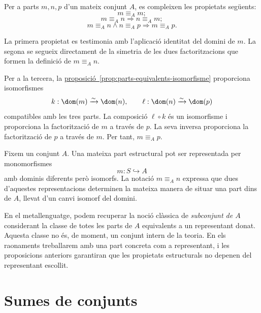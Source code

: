 \begin{proposicio}\label{prop:equivalencia-parts}
Per a parts \(m,n,p\) d'un mateix conjunt \(A\), es compleixen les propietats següents:
\[
m\equiv_A m;
\]
\[
m\equiv_A n\Longrightarrow n\equiv_A m;
\]
\[
m\equiv_A n\land n\equiv_A p
\Longrightarrow
m\equiv_A p.
\]
\end{proposicio}

\begin{prova}
La primera propietat es testimonia amb l'aplicació identitat del domini de \(m\). La segona se segueix directament de la simetria de les dues factoritzacions que formen la definició de \(m\equiv_A n\).

Per a la tercera, la \hyperref[prop:parts-equivalents-isomorfisme]{proposició~\ref*{prop:parts-equivalents-isomorfisme}} proporciona isomorfismes
\[
k:\dom(m)\xrightarrow{\sim}\dom(n),
\qquad
\ell:\dom(n)\xrightarrow{\sim}\dom(p)
\]
compatibles amb les tres parts. La composició \(\ell\circ k\) és un isomorfisme i proporciona la factorització de \(m\) a través de \(p\). La seva inversa proporciona la factorització de \(p\) a través de \(m\). Per tant, \(m\equiv_A p\).
\end{prova}

\begin{observacio}\label{obs:subconjunt-metallenguatge}
Fixem un conjunt \(A\). Una mateixa part estructural pot ser representada per monomorfismes
\[
m:S\hookrightarrow A
\]
amb dominis diferents però isomorfs. La notació \(m\equiv_A n\) expressa que dues d'aquestes representacions determinen la mateixa manera de situar una part dins de \(A\), llevat d'un canvi isomorf del domini.

En el metallenguatge, podem recuperar la noció clàssica de \emph{subconjunt de \(A\)} considerant la classe de totes les parts de \(A\) equivalents a un representant donat. Aquesta classe no és, de moment, un conjunt intern de la teoria. En els raonaments treballarem amb una part concreta com a representant, i les proposicions anteriors garantiran que les propietats estructurals no depenen del representant escollit.
\end{observacio}

\section{Sumes de conjunts}\label{sec:suma}


